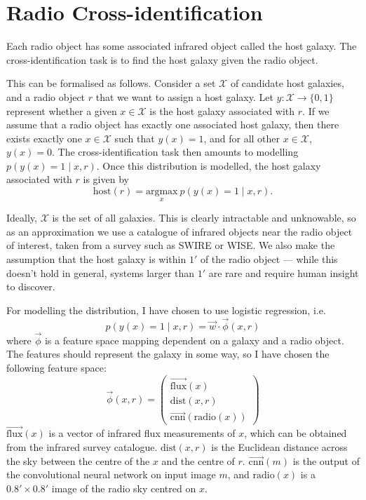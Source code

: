 \documentclass[11pt]{book}
\begin{document}
\section{Radio Cross-identification}
\label{sec:cross-identification}

    Each radio object has some associated infrared object called the host galaxy. The cross-identification task is to find the host galaxy given the radio object.
    
    This can be formalised as follows. Consider a set $\mathcal X$ of candidate host galaxies, and a radio object $r$ that we want to assign a host galaxy. Let $y : \mathcal X \to \{0, 1\}$ represent whether a given $x \in \mathcal X$ is the host galaxy associated with $r$. If we assume that a radio object has exactly one associated host galaxy, then there exists exactly one $x \in \mathcal X$ such that $y(x) = 1$, and for all other $x \in \mathcal X$, $y(x) = 0$. The cross-identification task then amounts to modelling $p(y(x) = 1 \mid x, r)$. Once this distribution is modelled, the host galaxy associated with $r$ is given by
    \begin{equation}
        \label{eq:cross-identification}
        \mbox{host}(r) = \underset{x}{\mbox{argmax}}\ p(y(x) = 1 \mid x, r).
    \end{equation}

    Ideally, $\mathcal X$ is the set of all galaxies. This is clearly intractable and unknowable, so as an approximation we use a catalogue of infrared objects near the radio object of interest, taken from a survey such as SWIRE or WISE. We also make the assumption that the host galaxy is within $1'$ of the radio object --- while this doesn't hold in general, systems larger than $1'$ are rare and require human insight to discover\cite{banfield16}.

    For modelling the distribution, I have chosen to use logistic regression, i.e.
    \begin{equation}
        \label{eq:logistic-regression-cross-identification}
        p(y(x) = 1 \mid x, r) = \vec w \cdot \vec \phi(x, r)
    \end{equation}
    where $\vec \phi$ is a feature space mapping dependent on a galaxy and a radio object. The features should represent the galaxy in some way, so I have chosen the following feature space:
    \begin{equation}
        \label{eq:galaxy-features}
        \vec \phi(x, r) = \begin{pmatrix}
            \vec{\mbox{flux}}(x)\\
            \mbox{dist}(x, r)\\
            \vec{\mbox{cnn}}(\mbox{radio}(x))
        \end{pmatrix}
    \end{equation}
    $\vec{\mbox{flux}}(x)$ is a vector of infrared flux measurements of $x$, which can be obtained from the infrared survey catalogue. $\mbox{dist}(x, r)$ is the Euclidean distance across the sky between the centre of the $x$ and the centre of $r$. $\vec{\mbox{cnn}}(m)$ is the output of the convolutional neural network on input image $m$, and $\mbox{radio}(x)$ is a $0.8' \times 0.8'$ image of the radio sky centred on $x$.
\end{document}
